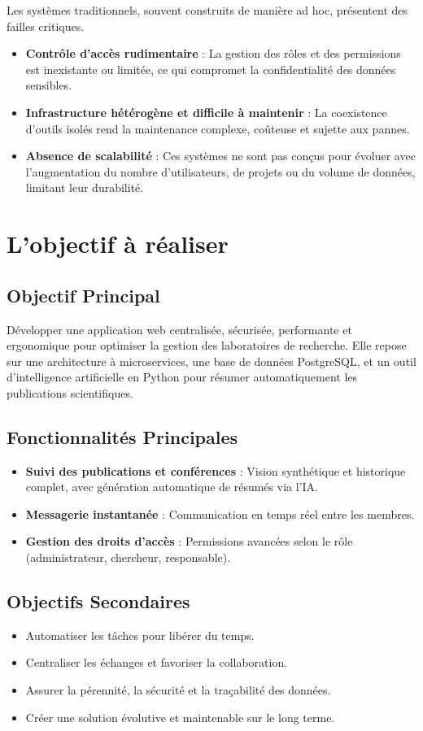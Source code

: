 \documentclass{rapportPfe}
\begin{document}
Les systèmes traditionnels, souvent construits de manière ad hoc, présentent des failles critiques.

\begin{itemize}
  \item \textbf{Contrôle d’accès rudimentaire} : La gestion des rôles et des permissions est inexistante ou limitée, ce qui compromet la confidentialité des données sensibles.
  \item \textbf{Infrastructure hétérogène et difficile à maintenir} : La coexistence d’outils isolés rend la maintenance complexe, coûteuse et sujette aux pannes.
  \item \textbf{Absence de scalabilité} : Ces systèmes ne sont pas conçus pour évoluer avec l’augmentation du nombre d’utilisateurs, de projets ou du volume de données, limitant leur durabilité.
\end{itemize}

\section{L’objectif à réaliser}

\subsection{Objectif Principal}
Développer une application web centralisée, sécurisée, performante et ergonomique pour optimiser la gestion des laboratoires de recherche. Elle repose sur une architecture à microservices, une base de données PostgreSQL, et un outil d’intelligence artificielle en Python pour résumer automatiquement les publications scientifiques.

\subsection{Fonctionnalités Principales}
\begin{itemize}
  \item \textbf{Suivi des publications et conférences} : Vision synthétique et historique complet, avec génération automatique de résumés via l’IA.
  \item \textbf{Messagerie instantanée} : Communication en temps réel entre les membres.
  \item \textbf{Gestion des droits d’accès} : Permissions avancées selon le rôle (administrateur, chercheur, responsable).
\end{itemize}

\subsection{Objectifs Secondaires}
\begin{itemize}
  \item Automatiser les tâches pour libérer du temps.
  \item Centraliser les échanges et favoriser la collaboration.
  \item Assurer la pérennité, la sécurité et la traçabilité des données.
  \item Créer une solution évolutive et maintenable sur le long terme.
\end{itemize}
\end{document}
